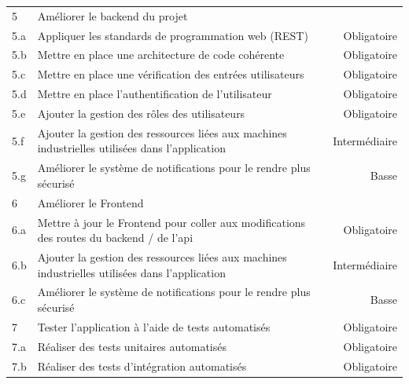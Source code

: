 \documentclass[
    iai, %
    il, %
]{heig-tb}
\begin{document}
\begin{table}[h]
\begin{center}
\begin{tabularx}{1.0\textwidth} {l|X|r}
            5   & Améliorer le backend du projet                                                                                         &               \\
            5.a & Appliquer les standards de programmation web (REST)                                                                    & Obligatoire   \\
            5.b & Mettre en place une architecture de code cohérente                                                                     & Obligatoire   \\
            5.c & Mettre en place une vérification des entrées utilisateurs                                                              & Obligatoire   \\
            5.d & Mettre en place l'authentification de l'utilisateur                                                                    & Obligatoire   \\
            5.e & Ajouter la gestion des rôles des utilisateurs                                                                          & Obligatoire   \\
            5.f & Ajouter la gestion des ressources liées aux machines industrielles utilisées dans l'application                        & Intermédiaire \\
            5.g & Améliorer le système de notifications pour le rendre plus sécurisé                                                     & Basse         \\
            6   & Améliorer le Frontend                                                                                                  &               \\
            6.a & Mettre à jour le Frontend pour coller aux modifications des routes du backend / de l'api                               & Obligatoire   \\
            6.b & Ajouter la gestion des ressources liées aux machines industrielles utilisées dans l'application                        & Intermédiaire \\
            6.c & Améliorer le système de notifications pour le rendre plus sécurisé                                                     & Basse         \\
            7   & Tester l'application à l'aide de tests automatisés                                                                     & Obligatoire   \\
            7.a & Réaliser des tests unitaires automatisés                                                                               & Obligatoire   \\
            7.b & Réaliser des tests d'intégration automatisés                                                                           & Obligatoire   \\
        \end{tabularx}
    \end{center}
\end{table}
\end{document}
